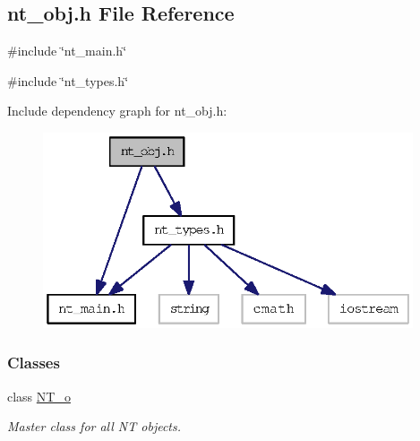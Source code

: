 \subsection{nt\_\-obj.h File Reference}
\label{nt__obj_8h}
{\ttfamily \#include \char`\"{}nt\_\-main.h\char`\"{}}\par
{\ttfamily \#include \char`\"{}nt\_\-types.h\char`\"{}}\par
Include dependency graph for nt\_\-obj.h:
\nopagebreak
\begin{figure}[H]
\begin{center}
\leavevmode
\includegraphics[width=310pt]{nt__obj_8h__incl}
\end{center}
\end{figure}
\subsubsection*{Classes}
\begin{DoxyCompactItemize}
\item 
class \hyperlink{class_n_t__o}{NT\_\-o}
\begin{DoxyCompactList}\small\item\em Master class for all NT objects. \item\end{DoxyCompactList}\end{DoxyCompactItemize}
